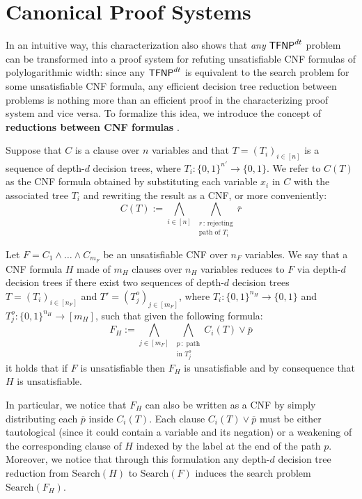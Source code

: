 \newpage

\section{Canonical Proof Systems}

In an intuitive way, this characterization also shows that \textit{any} $\mathsf{TFNP}^{dt}$ problem can be transformed into a proof system for refuting unsatisfiable CNF formulas of polylogarithmic width: since any $\mathsf{TFNP}^{dt}$ is equivalent to the search problem for some unsatisfiable CNF formula, any efficient decision tree reduction between problems is nothing more than an efficient proof in the characterizing proof system and vice versa. To formalize this idea, we introduce the concept of \textbf{reductions between CNF formulas} \cite{tfnp_characterization}.

Suppose that $C$ is a clause over $n$ variables and that $T = (T_i)_{i \in [n]}$ is a sequence of depth-$d$ decision trees, where $T_i : \{0,1\}^{n'} \to \{0,1\}$. We refer to $C(T)$ as the CNF formula obtained by substituting each variable $x_i$ in $C$ with the associated tree $T_i$ and rewriting the result as a CNF, or more conveniently:
\[C(T) := \bigwedge_{i \in [n]} \, \bigwedge_{\substack{r \,:\, \text{rejecting} \\ \text{path of $T_i$}}} \overline{r}\]

\begin{definition}
    Let $F = C_1 \land \ldots \land C_{m_F}$ be an unsatisfiable CNF over $n_F$ variables. We say that a CNF formula $H$ made of $m_H$ clauses over $n_H$ variables reduces to $F$ via depth-$d$ decision trees if there exist two sequences of depth-$d$ decision trees $T = (T_i)_{i \in [n_F]}$ and $T' = (T_j^o)_{j \in [m_F]}$, where $T_i : \{0,1\}^{n_H} \to \{0,1\}$ and $T_j^o : \{0,1\}^{n_H} \to [m_H]$, such that given the following formula:
    \[F_H := \bigwedge_{j \in [m_F]} \,\bigwedge_{\substack{p \,:\; \text{path} \\ \text{in } T_j^o}} C_i(T) \lor \overline{p}\]
    it holds that if $F$ is unsatisfiable then $F_H$ is unsatisfiable and by consequence that $H$ is unsatisfiable. 
\end{definition}

In particular, we notice that $F_H$ can also be written as a CNF by simply distributing each $\overline{p}$ inside $C_i(T)$. Each clause $C_i(T) \lor \overline{p}$ must be either tautological (since it could contain a variable and its negation) or a weakening of the corresponding clause of $H$ indexed by the label at the end of the path $p$. Moreover, we notice that through this formulation any depth-$d$ decision tree reduction from $\mathrm{Search}(H)$ to $\mathrm{Search}(F)$ induces the search problem $\mathrm{Search}(F_H)$.

